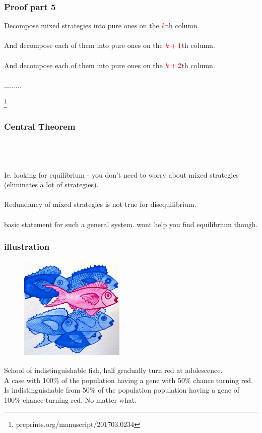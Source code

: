 \documentclass{beamer}
\newcommand\blfootnote[1]{%
  \begingroup
  \renewcommand\thefootnote{}\footnote{#1}%
  \addtocounter{footnote}{-1}%
  \endgroup
}
\begin{document}
\begin{frame}
\frametitle{Proof part 5}
Decompose mixed strategies into pure ones on the $\textcolor{red}{k}$th column.\\\-\\
And decompose each of them into pure ones on the $\textcolor{red}{k+1}$th column.\\\-\\
And decompose each of them into pure ones on the $\textcolor{red}{k+2}$th column.\\\-\\
.........

\blfootnote{%
preprints.org/manuscript/201703.0234
}
\end{frame}




\begin{frame}
\frametitle{Central Theorem}
\\\-\\\-\\
Ie. looking for equilibrium - you don't need to worry about mixed strategies (eliminates a lot of strategies).\\\-\\
Redundancy of mixed strategies is not true for disequilibrium.\\\-\\
basic statement for such a general system. wont help you find equilibrium though.\\
\end{frame}







\begin{frame}
\frametitle{illustration}
\begin{figure}
    \includegraphics[width=5cm,height=5cm]{school1.png}
    \label{fig:my_label}
\end{figure}
School of indistinguishable fish, half gradually turn red at adolescence.\\
A case with 100\% of the population having a gene with 50\% chance turning red. Is indistinguishable from 50\% of the population population having a gene of 100\% chance turning red. No matter what.
\end{frame}
\end{document}
